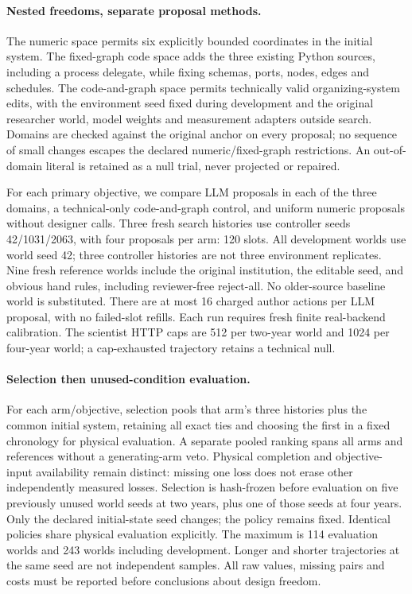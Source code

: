 \documentclass{article}
\begin{document}
\paragraph{Nested freedoms, separate proposal methods.}
The numeric space permits six explicitly bounded coordinates in the initial
system. The fixed-graph code space adds the three existing Python sources,
including a process delegate, while fixing schemas, ports, nodes, edges and
schedules. The code-and-graph space permits technically valid organizing-system
edits, with the environment seed fixed during development and the original
researcher world, model weights and measurement adapters outside search.
Domains are checked against the original anchor on every proposal; no sequence
of small changes escapes the declared numeric/fixed-graph restrictions.
An out-of-domain literal is retained as a null trial, never projected or repaired.

For each primary objective, we compare LLM proposals in each of the three
domains, a technical-only code-and-graph control, and uniform numeric proposals
without designer calls. Three fresh search histories use controller seeds
42/1031/2063, with four proposals per arm: 120 slots. All development worlds use
world seed 42; three controller histories are not three environment replicates.
Nine fresh reference worlds include the original institution, the editable seed,
and obvious hand rules, including reviewer-free reject-all. No older-source
baseline world is substituted. There are at most 16 charged author actions per
LLM proposal, with no failed-slot refills. Each run requires fresh finite
real-backend calibration. The scientist HTTP caps are 512 per two-year world
and 1024 per four-year world; a cap-exhausted trajectory retains a technical null.

\paragraph{Selection then unused-condition evaluation.}
For each arm/objective, selection pools that arm's three histories plus the
common initial system, retaining all exact ties and choosing the first in a
fixed chronology for physical evaluation. A separate pooled ranking spans all
arms and references without a generating-arm veto. Physical completion and
objective-input availability remain distinct: missing one loss does not erase
other independently measured losses. Selection is hash-frozen before evaluation
on five previously unused world seeds at two years, plus one of those seeds
at four years. Only the declared initial-state seed changes; the policy remains
fixed. Identical policies share physical evaluation explicitly. The maximum is
114 evaluation worlds and 243 worlds including development. Longer and shorter
trajectories at the same seed are not independent samples. All raw values,
missing pairs and costs must be reported before conclusions about design freedom.
\end{document}

